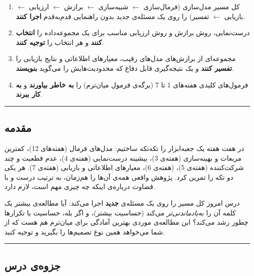 \begin{enumerate}
\def\labelenumi{\arabic{enumi}.}
\tightlist
\item
  کل مسیر مدل‌سازی (فرمال‌سازی \ensuremath{\leftarrow} شبیه‌سازی \ensuremath{\leftarrow} برازش \ensuremath{\leftarrow} ارزیابی \ensuremath{\leftarrow} بازیابی \ensuremath{\leftarrow}
  تفسیر) را روی یک مسئله‌ی جدید بدون راهنمایی قدم‌به‌قدم \textbf{اجرا
  کنند}.
\item
  درست‌نمایی، روش برازش و روش ارزیابی مناسب برای یک مجموعه‌داده را
  \textbf{انتخاب کنند} و هر انتخاب را \textbf{توجیه کنند}.
\item
  مجموعه‌ای از برازش‌های مدل‌های رقیب، معیارهای اطلاعاتی و نتایج بازیابی را
  \textbf{تفسیر کنند} و یک نتیجه‌گیری قابل دفاع که محدودیت‌هایش را می‌گوید
  \textbf{بنویسند}.
\item
  فرمول‌های کلیدی هفته‌های 1 تا 7 (برگه‌ی فرمول میان‌ترم) را \textbf{به خاطر
  بیاورند} و \textbf{به کار ببرند}.
\end{enumerate}

\begin{center}\rule{0.5\linewidth}{0.5pt}\end{center}

\subsection{مقدمه}

در هفت هفته یک جعبه‌ابزار را تکه‌تکه ساختیم: مدل‌های فرمال (هفته‌های 1\lr{--}2)،
کمترین مربعات و بهینه‌سازی (هفته‌ی 3)، بیشینه درست‌نمایی (هفته‌ی 4)، عدم
قطعیت و چند شرکت‌کننده (هفته‌ی 5)،  (هفته‌ی 6)،
معیارهای اطلاعاتی و بازیابی (هفته‌ی 7). هر  یکی دو تکه را تمرین
کرد. پژوهش واقعی همه‌ی آن‌ها را هم‌زمان، به ترتیب درست و با قضاوت درباره‌ی
اینکه چه چیزی مهم است، لازم دارد.

درس امروز کل مسیر را روی یک مسئله‌ی \textbf{جدید} اجرا می‌کند: آیا مطالعه‌ی
بیشتر یک کلمه آن را \emph{به‌یادماندنی‌تر} می‌کند (حساسیت بیشتر)، و اگر
بله، حساسیت با تکرارها چطور رشد می‌کند؟ این مطالعه‌ی موردی بهترین آمادگی
برای میان‌ترم هم هست که از شما می‌خواهد همین نوع تصمیم‌ها را بگیرید و توجیه
کنید.

\begin{center}\rule{0.5\linewidth}{0.5pt}\end{center}


\subsection{جزوه‌ی درس}

